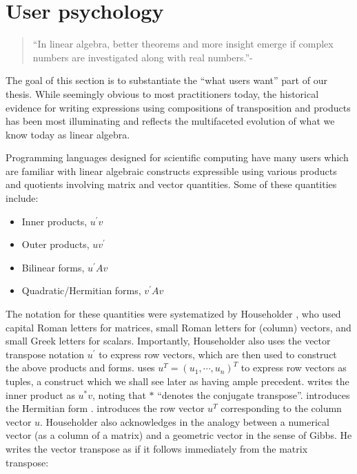 \section{User psychology}

\begin{quote}
``In linear algebra, better theorems and more insight emerge if complex numbers are investigated along with real numbers.''-\cite[p. 1]{Axler2015}
\end{quote}

The goal of this section is to substantiate the ``what users want'' part of our thesis. While seemingly obvious to most practitioners today, the historical evidence for writing expressions using compositions of transposition and products has been most illuminating and reflects the multifaceted evolution of what we know today as linear algebra.

Programming languages designed for scientific computing have many users which are familiar with linear algebraic constructs expressible using various products and quotients involving matrix and vector quantities. Some of these quantities include:

\begin{itemize}
  \item Inner products, $u^\prime v$
  \item Outer products, $u v^\prime$
  \item Bilinear forms, $u^\prime A v$
  \item Quadratic/Hermitian forms, $v^\prime A v$
\end{itemize}

The notation for these quantities were systematized by Householder \cite{Householder1953,Householder1955}, who used capital Roman letters for matrices, small Roman letters for (column) vectors, and small Greek letters for scalars. Importantly, Householder also uses the vector transpose notation $u^\prime$ to express row vectors, which are then used to construct the above products and forms. \cite{Householder1955} uses $u^T = (u_1, \cdots, u_n)^T$ to express row vectors as tuples, a construct which we shall see later as having ample precedent. \cite{Householder1955} writes the inner product as $u^* v$, noting that $*$ ``denotes the conjugate transpose''. \cite[Sec. 4.01]{Householder1953} introduces the Hermitian form . \cite[Sec. 2.04]{Householder1953} introduces the row vector $u^T$ corresponding to the column vector $u$. Householder also acknowledges in \cite[Sec. 2.04]{Householder1953} the analogy between a numerical vector (as a column of a matrix) and a geometric vector in the sense of Gibbs. He writes the vector transpose as if it follows immediately from the matrix transpose:

